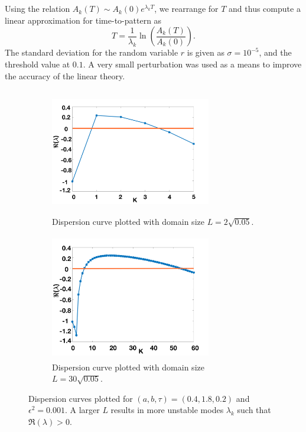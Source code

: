 \\\\
Using the relation $A_k(T)\sim A_k(0)e^{\lambda_k T}$, we rearrange for $T$ and thus compute a linear approximation for time-to-pattern as
\begin{equation}
    T=\frac{1}{\lambda_k}\ln\left(\frac{A_k(T)}{A_k(0)}\right).
\end{equation}
The standard deviation for the random variable $r$ is given as $\sigma=10^{-5}$, and the threshold value at $0.1$. A very small perturbation was used as a means to improve the accuracy of the linear theory.
\begin{figure}[H]
    \centering
    \begin{subfigure}[b]{0.45\textwidth}
        \centering
        \includegraphics[width=7cm,height=5.5cm]{compdisp1.png}
        \caption{Dispersion curve plotted with domain size $L=2\sqrt{0.05}$.}
        \label{fig:compdisp1}
    \end{subfigure}
    \hfill
    \begin{subfigure}[b]{0.45\textwidth}
        \centering
        \includegraphics[width=7cm,height=5.5cm]{compdisp2.png}
        \caption{Dispersion curve plotted with domain size $L=30\sqrt{0.05}$.}
        \label{fig:compdisp2}
    \end{subfigure}
    \caption{Dispersion curves plotted for $(a,b,\tau)=(0.4,1.8,0.2)$ and $\epsilon^2=0.001$. A larger $L$ results in more unstable modes $\lambda_k$ such that $\Re(\lambda)>0$. }
    \label{fig:compardisp}
\end{figure}
